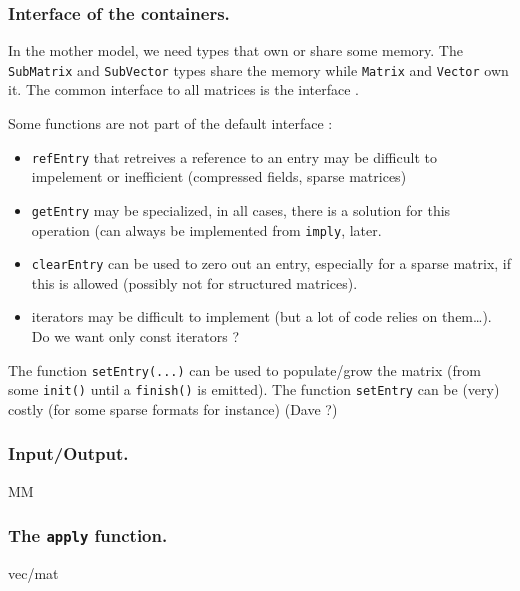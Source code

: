 \subsubsection{Interface of the containers.}
%
In the mother model, we need types that own or share some memory.  The
\texttt{SubMatrix} and \texttt{SubVector} types share the memory while
\texttt{Matrix} and \texttt{Vector} own it.
%
The common interface to all matrices is the \applin  interface .
%

%
\begin{remark}
%
	Some functions are not part of the default interface :
	\begin{itemize}
		\item \texttt{refEntry} that retreives a reference to an entry
			may be difficult to impelement or inefficient
			(compressed fields, sparse matrices)
		\item \texttt{getEntry} may be specialized, in all cases, there
			is a solution for this operation (can always be
			implemented from \texttt{imply}, \cf{} later.
		\item \texttt{clearEntry} can be used to zero out an entry,
			especially for a sparse matrix, if this is allowed
			(possibly not for structured matrices).
		\item iterators may be difficult to implement (but a lot of
			code relies on them\ldots). Do we want only const
			iterators ?
	\end{itemize}
%
The function \texttt{setEntry(...)} can be used to populate/grow the matrix (from some
\texttt{init()} until a \texttt{finish()} is emitted).  The function \texttt{setEntry} can be (very)
costly (for some sparse formats for instance) (Dave ?)
%
\end{remark}

\subsubsection{Input/Output.}
MM
\subsubsection{The \texttt{apply} function.}
%
vec/mat
%
